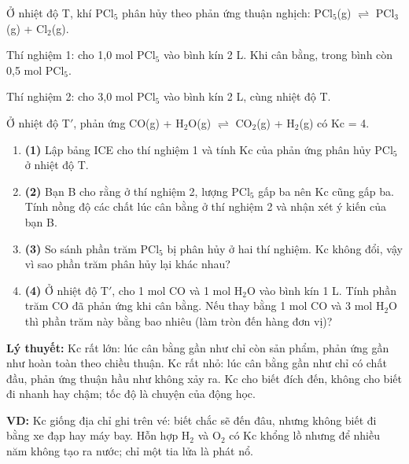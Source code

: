 \begin{readingpassage}
Ở nhiệt độ T, khí PCl$_{5}$ phân hủy theo phản ứng thuận nghịch: PCl$_{5}$(g) $\rightleftharpoons$ PCl$_{3}$(g) + Cl$_{2}$(g).

Thí nghiệm 1: cho 1,0 mol PCl$_{5}$ vào bình kín 2 L. Khi cân bằng, trong bình còn 0,5 mol PCl$_{5}$.

Thí nghiệm 2: cho 3,0 mol PCl$_{5}$ vào bình kín 2 L, cùng nhiệt độ T.

Ở nhiệt độ T$'$, phản ứng CO(g) + H$_{2}$O(g) $\rightleftharpoons$ CO$_{2}$(g) + H$_{2}$(g) có Kc = 4.

\end{readingpassage}
\qhead
\begin{enumerate}[label={}, leftmargin=0.5em, itemsep=6pt]
\item \textbf{(1)} Lập bảng ICE cho thí nghiệm 1 và tính Kc của phản ứng phân hủy PCl$_{5}$ ở nhiệt độ T. 
\item \textbf{(2)} Bạn B cho rằng ở thí nghiệm 2, lượng PCl$_{5}$ gấp ba nên Kc cũng gấp ba. Tính nồng độ các chất lúc cân bằng ở thí nghiệm 2 và nhận xét ý kiến của bạn B. 
\item \textbf{(3)} So sánh phần trăm PCl$_{5}$ bị phân hủy ở hai thí nghiệm. Kc không đổi, vậy vì sao phần trăm phân hủy lại khác nhau? 
\item \textbf{(4)} Ở nhiệt độ T$'$, cho 1 mol CO và 1 mol H$_{2}$O vào bình kín 1 L. Tính phần trăm CO đã phản ứng khi cân bằng. Nếu thay bằng 1 mol CO và 3 mol H$_{2}$O thì phần trăm này bằng bao nhiêu (làm tròn đến hàng đơn vị)? 
\end{enumerate}
\textbf{Lý thuyết:} Kc rất lớn: lúc cân bằng gần như chỉ còn sản phẩm, phản ứng gần như hoàn toàn theo chiều thuận. Kc rất nhỏ: lúc cân bằng gần như chỉ có chất đầu, phản ứng thuận hầu như không xảy ra. Kc cho biết đích đến, không cho biết đi nhanh hay chậm; tốc độ là chuyện của động học.

\textbf{VD:} Kc giống địa chỉ ghi trên vé: biết chắc sẽ đến đâu, nhưng không biết đi bằng xe đạp hay máy bay. Hỗn hợp H$_{2}$ và O$_{2}$ có Kc khổng lồ nhưng để nhiều năm không tạo ra nước; chỉ một tia lửa là phát nổ.

